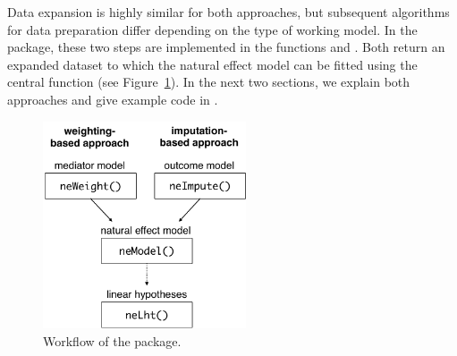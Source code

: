 \documentclass[nojss]{jss}
\begin{document}
\par Data expansion is highly similar for both approaches, but subsequent algorithms for data preparation differ depending on the type of working model. In the  package, these two steps are implemented in the functions  and . Both return an expanded dataset to which the natural effect model can be fitted using the central function  (see Figure~\ref{fig:workflow}). In the next two sections, we explain both approaches and give example code in .
\begin{figure}[t]
  \centering
  \includegraphics[width=6cm]{workflow.pdf}
  \caption{Workflow of the  package.}
  \label{fig:workflow}
\end{figure}
\end{document}
